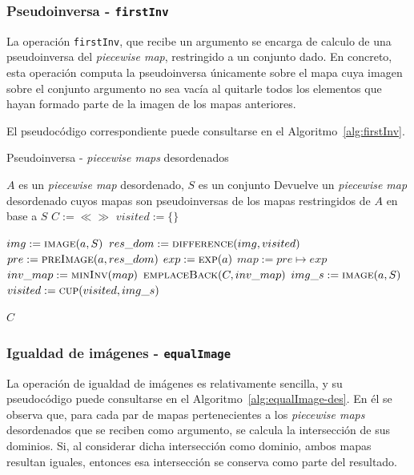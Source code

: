 \subsubsection{Pseudoinversa - \texttt{firstInv}}

La operación \texttt{firstInv}, que recibe un argumento se encarga de calculo de una pseudoinversa del \textit{piecewise map}, restringido a un conjunto dado. En concreto, esta operación computa la pseudoinversa únicamente sobre el mapa cuya imagen sobre el conjunto argumento no sea vacía al quitarle todos los elementos que hayan formado parte de la imagen de los mapas anteriores.

El pseudocódigo correspondiente puede consultarse en el Algoritmo~\ref{alg:firstInv}.

\begin{algorithm}
\caption{Pseudoinversa - \textit{piecewise maps} desordenados}
\label{alg:firstInv}
\begin{algorithmic}[1]
\Require $A$ es un \textit{piecewise map} desordenado, $S$ es un conjunto
\Ensure Devuelve un \textit{piecewise map} desordenado cuyos mapas son pseudoinversas de los mapas restringidos de $A$ en base a $S$
  \State $C :=\ll\gg$
  \State $visited := \{\}$

    \State $img := \Call{image}{a, S}$
    \State $res\_dom := \Call{difference}{img, visited}$
      \State $pre := \Call{preImage}{a, res\_dom}$
      \State $exp := \Call{exp}{a}$
      \State $map := pre \mapsto exp$
      \State $inv\_map := \Call{minInv}{map}$
      \State $\Call{emplaceBack}{C, inv\_map}$
      \State $img\_s := \Call{image}{a, S}$
      \State $visited := \Call{cup}{visited, img\_s}$
    \EndIf
  \EndFor

  \State \Return $C$
\EndFunction
\end{algorithmic}
\end{algorithm}

\subsubsection{Igualdad de imágenes - \texttt{equalImage}}

La operación de igualdad de imágenes es relativamente sencilla, y su pseudocódigo puede consultarse en el Algoritmo~\ref{alg:equalImage-des}. En él se observa que, para cada par de mapas pertenecientes a los \textit{piecewise maps} desordenados que se reciben como argumento, se calcula la intersección de sus dominios. Si, al considerar dicha intersección como dominio, ambos mapas resultan iguales, entonces esa intersección se conserva como parte del resultado.

